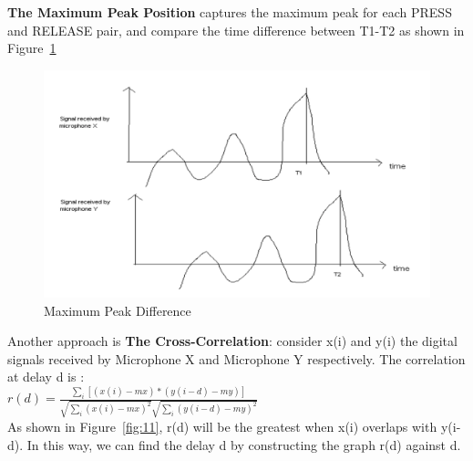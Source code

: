 \documentclass[12pt,a4paper]{article}
\begin{document}
\textbf{The Maximum Peak Position} captures the maximum peak for each PRESS and RELEASE pair, and compare the time difference between T1-T2 as shown in Figure~\ref{fig:10}\\

\begin{figure}[h]
\begin{center}
        \includegraphics[scale=0.45]{xyPeakComp.png}
        \caption{Maximum Peak Difference}
        \label{fig:10}
\end{center}
\end{figure} \par
\FloatBarrier

Another approach is \textbf{The Cross-Correlation}: consider x(i) and y(i) the digital signals received by Microphone X and Microphone Y respectively. The correlation at delay d is : \\

$r(d) = \frac{\sum\limits_i [(x(i)-mx)*(y(i-d)-my)] }{\sqrt{\sum\limits_i (x(i)-mx)^{2}} \sqrt{\sum\limits_i (y(i-d)-my)^{2}}}$\\

As shown in Figure~\ref{fig:11}, r(d) will be the greatest when x(i) overlaps with y(i-d). In this way, we can find the delay d by constructing the graph r(d) against d.\\
\end{document}
